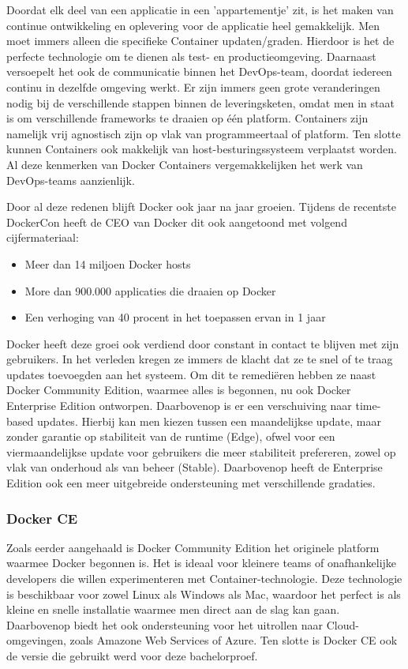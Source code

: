Doordat elk deel van een applicatie in een 'appartementje' zit, is het maken van continue ontwikkeling en oplevering voor de applicatie heel gemakkelijk. Men moet immers alleen die specifieke Container updaten/graden. Hierdoor is het de perfecte technologie om te dienen als test- en productieomgeving. Daarnaast versoepelt het ook de communicatie binnen het DevOps-team, doordat iedereen continu in dezelfde omgeving werkt. Er zijn immers geen grote veranderingen nodig bij de verschillende stappen binnen de leveringsketen, omdat men in staat is om verschillende frameworks te draaien op één platform. Containers zijn namelijk vrij agnostisch zijn op vlak van programmeertaal of platform. Ten slotte kunnen Containers ook makkelijk van host-besturingssysteem verplaatst worden. Al deze kenmerken van Docker Containers vergemakkelijken het werk van DevOps-teams aanzienlijk.

Door al deze redenen blijft Docker ook jaar na jaar groeien. Tijdens de recentste DockerCon heeft de CEO van Docker dit ook aangetoond met volgend cijfermateriaal:
\begin{itemize}[noitemsep]
	\item Meer dan 14 miljoen Docker hosts
	\item More dan 900.000 applicaties die draaien op Docker
	\item Een verhoging van 40 procent in het toepassen ervan in 1 jaar
\end{itemize}

Docker heeft deze groei ook verdiend door constant in contact te blijven met zijn gebruikers. In het verleden kregen ze immers de klacht dat ze te snel of te traag updates toevoegden aan het systeem. Om dit te remediëren hebben ze naast Docker Community Edition, waarmee alles is begonnen, nu ook Docker Enterprise Edition ontworpen. Daarbovenop is er een verschuiving naar time-based updates. Hierbij kan men kiezen tussen een maandelijkse update, maar zonder garantie op stabiliteit van de runtime (Edge), ofwel voor een viermaandelijkse update voor gebruikers die meer stabiliteit prefereren, zowel op vlak van onderhoud als van beheer (Stable). Daarbovenop heeft de Enterprise Edition ook een meer uitgebreide ondersteuning met verschillende gradaties.

\subsubsection{Docker CE}
Zoals eerder aangehaald is Docker Community Edition het originele platform waarmee Docker begonnen is. Het is ideaal voor kleinere teams of onafhankelijke developers die willen experimenteren met Container-technologie. Deze technologie is beschikbaar voor zowel Linux als Windows als Mac, waardoor het perfect is als kleine en snelle installatie waarmee men direct aan de slag kan gaan. Daarbovenop biedt het ook ondersteuning voor het uitrollen naar Cloud-omgevingen, zoals Amazone Web Services of Azure. Ten slotte is Docker CE ook de versie die gebruikt werd voor deze bachelorproef.

